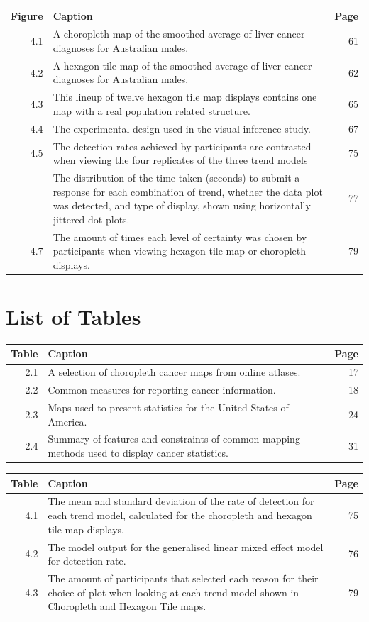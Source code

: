 \documentclass{monashthesis}
\begin{document}
\begin{tabular}{r>{\raggedright\arraybackslash}p{30em}r}
\toprule
Figure & Caption & Page\\
\midrule
4.1 & A choropleth map of the smoothed average of liver cancer diagnoses for Australian males. & 61\\
4.2 & A hexagon tile map of the smoothed average of liver cancer diagnoses for Australian males. & 62\\
4.3 & This lineup of twelve hexagon tile map displays contains one map with a real population related structure. & 65\\
4.4 & The experimental design used in the visual inference study. & 67\\
4.5 & The detection rates achieved by participants are contrasted when viewing the four replicates of the three trend models & 75\\
\addlinespace
4.6 & The distribution of the time taken (seconds) to submit a response for each combination of trend, whether the data plot was detected, and type of display, shown using horizontally jittered dot plots. & 77\\
4.7 & The amount of times each level of certainty was chosen by participants when viewing hexagon tile map or choropleth displays. & 79\\
\bottomrule
\end{tabular}

\hypertarget{list-of-tables}{%
\chapter*{List of Tables}\label{list-of-tables}}

\begin{tabular}{r>{\raggedright\arraybackslash}p{30em}r}
\toprule
Table & Caption & Page\\
\midrule
2.1 & A selection of choropleth cancer maps from online atlases. & 17\\
2.2 & Common measures for reporting cancer information. & 18\\
2.3 & Maps used to present statistics for the United States of America. & 24\\
2.4 & Summary of features and constraints of common mapping methods used to display
cancer statistics. & 31\\
\bottomrule
\end{tabular}

\begin{tabular}{r>{\raggedright\arraybackslash}p{30em}r}
\toprule
Table & Caption & Page\\
\midrule
4.1 & The mean and standard deviation of the rate of detection for each trend model, calculated for the choropleth and hexagon tile map displays. & 75\\
4.2 & The model output for the generalised linear mixed effect model for detection rate. & 76\\
4.3 & The amount of participants that selected each reason for their choice of plot when looking at each trend model shown in Choropleth and Hexagon Tile maps. & 79\\
\bottomrule
\end{tabular}
\end{document}
